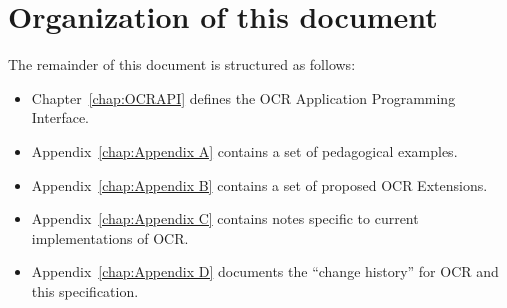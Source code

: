 \makeindex


    

    \setcounter{page}{0}
    \setcounter{tocdepth}{2}

    \begin{spacing}{1.3}
        \tableofcontents
    \end{spacing}

    
    \newpage{}

    

    \section{Organization of this document}
    \label{sec:Organization of this document}

    The remainder of this document is structured as follows:

    \begin{itemize}
        \item Chapter~\ref{chap:OCRAPI} defines the OCR Application Programming Interface.
        \item Appendix~\ref{chap:Appendix A} contains a set of pedagogical examples.
        \item Appendix~\ref{chap:Appendix B} contains a set of proposed OCR Extensions.
        \item Appendix~\ref{chap:Appendix C} contains notes specific to current implementations of OCR.
        \item Appendix~\ref{chap:Appendix D} documents the ``change history''
          for OCR and this specification.
    \end{itemize}
    


     


    \setcounter{chapter}{0}  %
    \renewcommand{\thechapter}{\Alph{chapter}}%
    \appendix

    

    

   

    

    \nolinenumbers
    \clearpage
    \printindex

